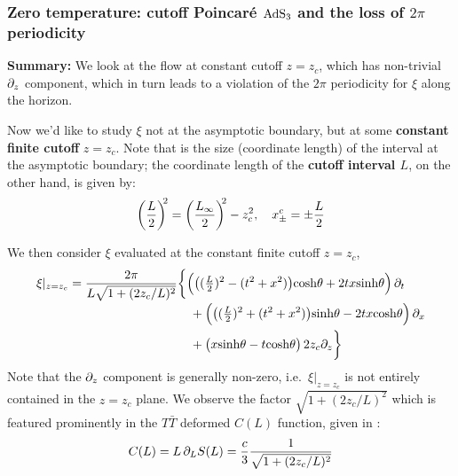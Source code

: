 \documentclass[11pt,a4paper]{article}
\newcommand{\TTbar}{\ensuremath{T\bar{T}}\xspace}
\begin{document}
\subsubsection{Zero temperature: cutoff Poincar\'e $\mathrm{AdS}_3$ and the loss of $2\pi$ periodicity}

\textbf{Summary:} We look at the flow at constant cutoff $z = z_c$, which has non-trivial $\partial_{z}$ component, which in turn leads to a violation of the $2\pi$ periodicity for $\xi$ along the horizon.
	
	Now we'd like to study $\xi$ not at the asymptotic boundary, but at some \textbf{constant finite cutoff} $z = z_c$. 
	Note that is the size (coordinate length) of the interval at the {asymptotic boundary}; the coordinate length of the \textbf{cutoff interval $L$}, on the other hand, is given by:
	\begin{equation}
		\pqty{\frac{L}{2}}^{\!\!2}
		= \pqty{\frac{L_\infty}{2}}^{\!\!2} - z_c^2,
	\quad
		x_\pm^c
		= \pm \frac{L}{2}
	\label{eq:length_relations}
	\end{equation}
	
	We then consider $\xi$ evaluated at the {constant finite cutoff} $z = z_c$,
	\begin{equation}
	\begin{aligned}
		\xi|_{z=z_c}
		= \frac{2\pi}{
				L\sqrt{1 + (2z_c/L)^2}
			}
		& \bigg\{
			\pqty\Big{
				\pqty{
					(\tfrac{L}{2})^2
					- (t^2 + x^2)
				} \cosh\theta
				+ 2tx \sinh\theta
			} \,\pdd{t}
		\\[-.5ex] &\quad 
			+ \pqty\Big{
				\pqty{
					(\tfrac{L}{2})^2
					+ (t^2 + x^2)
				} \sinh\theta
				- 2tx \cosh\theta
			} \,\pdd{x}
		\\ &\quad 
			+ \pqty\big{
				x\sinh\theta
				- t\cosh\theta
			} \,2z_c\pdd{z}
		\bigg\}
	\end{aligned}
	\end{equation}
	Note that the $\partial_{z}$ component is generally non-zero, i.e.~$\xi|_{z=z_c}$ is not entirely contained in the $z = z_c$ plane. 
	We observe the factor $
		\sqrt{1 + (2z_c/L)^2}
	$ which is featured prominently in the \TTbar deformed $C(L)$ function, given in \cite{Lewkowycz:2019xse}:
	\begin{equation}
		C(L) = L\,\partial_{L} S(L)
		= \frac{c}{3} 
			\frac{1}{
				\sqrt{1 + (2z_c/L)^2}
			}
	\end{equation}
	
\end{document}
